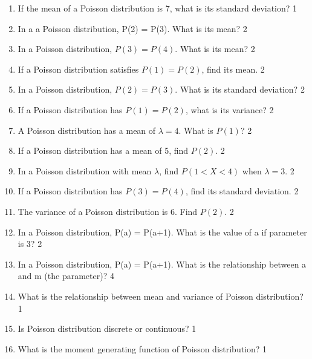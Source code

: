 \documentclass[a4paper,oneside, margin=1.4in]{book}
\begin{document}
\begin{enumerate}
\item If the mean of a Poisson distribution is 7, what is its standard deviation? \hfill 1

\item In a a Poisson distribution, P(2) = P(3). What is its mean?  \hfill 2

\item In a Poisson distribution, \( P(3) = P(4) \). What is its mean? \hfill 2

\item If a Poisson distribution satisfies \( P(1) = P(2) \), find its mean. \hfill 2

\item In a Poisson distribution, \( P(2) = P(3) \). What is its standard deviation? \hfill 2

\item If a Poisson distribution has \( P(1) = P(2) \), what is its variance? \hfill 2

\item A Poisson distribution has a mean of \( \lambda = 4 \). What is \( P(1) \)? \hfill 2

\item If a Poisson distribution has a mean of 5, find \( P(2) \). \hfill 2

\item In a Poisson distribution with mean \( \lambda \), find \( P(1 < X < 4) \) when \( \lambda = 3 \). \hfill 2

\item If a Poisson distribution has \( P(3) = P(4) \), find its standard deviation. \hfill 2

\item The variance of a Poisson distribution is 6. Find \( P(2) \). \hfill 2

 \item In a Poisson distribution, P(a) = P(a+1). What is the value of a if parameter is 3? \hfill 2

\item In a Poisson distribution, P(a) = P(a+1). What is the relationship between a and m (the parameter)? \hfill 4

\item What is the relationship between mean and variance of Poisson distribution? \hfill 1

\item Is Poisson distribution discrete or continuous? \hfill 1

\item What is the moment generating function of Poisson distribution? \hfill 1


\end{enumerate}
\end{document}
